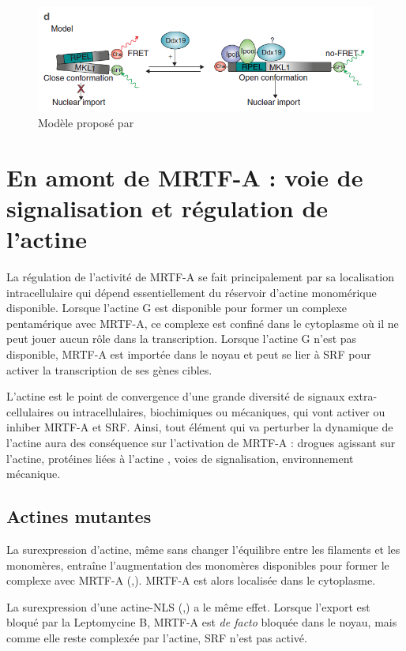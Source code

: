 \begin{figure}[h!]
\includegraphics[scale=0.5]{Ddx19.png}
\caption{Modèle proposé par \cite{rajakyla_rna_2015} \label{Ddx}}
\end{figure}



\section{En amont de MRTF-A : voie de signalisation et régulation de l'actine} 


La régulation de l'activité de MRTF-A se fait principalement par sa localisation intracellulaire qui dépend essentiellement du réservoir d'actine monomérique disponible. 
Lorsque l'actine G est disponible pour former un complexe pentamérique avec MRTF-A, ce complexe est confiné dans le cytoplasme où il ne peut jouer aucun rôle dans la transcription. 
Lorsque l'actine G n'est pas disponible, MRTF-A est importée dans le noyau et peut se lier à SRF pour activer la transcription de ses gènes cibles. 

L'actine est le point de convergence d'une grande diversité de signaux extra-cellulaires ou intracellulaires, biochimiques ou mécaniques, qui vont activer ou inhiber MRTF-A et SRF. 
Ainsi, tout élément qui va perturber la dynamique de l'actine aura des conséquence sur l'activation de MRTF-A : drogues agissant sur l'actine, protéines liées à l'actine , voies de signalisation, environnement mécanique. 


\subsection{Actines mutantes}

La surexpression d'actine, même sans changer l'équilibre entre les filaments et les monomères, entraîne l'augmentation des monomères disponibles pour former le complexe avec MRTF-A (\cite{miralles_actin_2003},\cite{vartiainen_nuclear_2007}). MRTF-A est alors localisée dans le cytoplasme. 

La surexpression d'une actine-NLS (\cite{vartiainen_nuclear_2007},\cite{posern_mutant_2002}) a le même effet. Lorsque l'export est bloqué par la Leptomycine B, MRTF-A est \emph{de facto} bloquée dans le noyau, mais comme elle reste complexée par l'actine, SRF n'est pas activé. 

